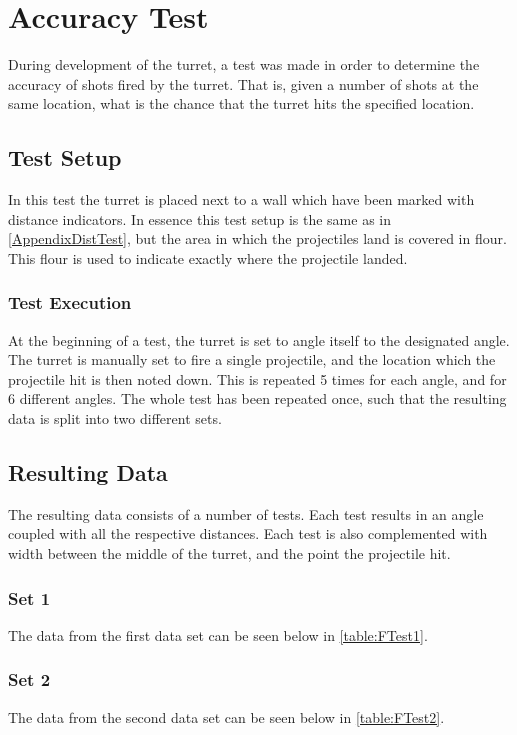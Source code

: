 \chapter{Accuracy Test}\label{AppendixAccTest}
During development of the turret, a test was made in order to determine the
accuracy of shots fired by the turret. That is, given a number of shots at the
same location, what is the chance that the turret hits the specified location.

\section{Test Setup}
In this test the turret is placed next to a wall which have been marked with
distance indicators. In essence this test setup is the same as in
\autoref{AppendixDistTest}, but the area in which the projectiles land is
covered in flour. This flour is used to indicate exactly where the projectile
landed.

\subsection{Test Execution}
At the beginning of a test, the turret is set to angle itself to the designated
angle. The turret is manually set to fire a single projectile, and the location
which the projectile hit is then noted down. This is repeated 5 times for each
angle, and for 6 different angles. The whole test has been repeated once, such
that the resulting data is split into two different sets.

\section{Resulting Data}
The resulting data consists of a number of tests. Each test results in an angle
coupled with all the respective distances. Each test is also complemented with
width between the middle of the turret, and the point the projectile hit.

\subsection{Set 1}
The data from the first data set can be seen below in \autoref{table:FTest1}. 

\subsection{Set 2}
The data from the second data set can be seen below in \autoref{table:FTest2}. 

